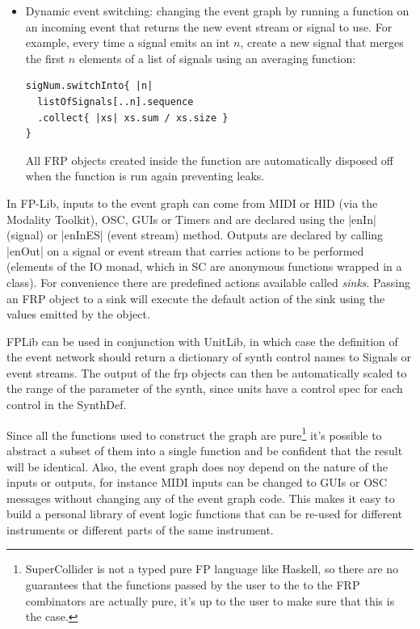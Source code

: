 \documentclass{article}
\begin{document}
\begin{itemize}
\begin{Verbatim}
\end{Verbatim}
\item Dynamic event switching: changing the event graph by running a function on an incoming event that returns the new event stream or signal to use. For example, every time a signal emits an int $n$, create a new signal that merges the first $n$ elements of a list of signals using an averaging function: 
\begin{Verbatim}
sigNum.switchInto{ |n|
  listOfSignals[..n].sequence
  .collect{ |xs| xs.sum / xs.size }
}
\end{Verbatim}
All FRP objects created inside the function are automatically disposed off when the function is run again preventing leaks.
\end{itemize}

In FP-Lib, inputs to the event graph can come from MIDI or HID (via the
Modality Toolkit), OSC, GUIs or Timers and are declared using  the |enIn| (signal) or |enInES| (event stream) method. Outputs are declared by calling |enOut| on a signal or event stream that carries actions to be performed (elements of the IO monad, which in SC are anonymous functions wrapped in a class). For convenience there are predefined actions available called \textit{sinks}. Passing an FRP object to a sink will execute the default action of the sink using the values emitted by the object.

FPLib can be used in conjunction with UnitLib, in which case the definition of the event network should return a dictionary of synth control names to Signals or event streams. The output of the frp objects can then be automatically scaled to the range of the parameter of the synth, since units have a control spec for each control in the SynthDef.

Since all the functions used to construct the graph are pure\footnote{SuperCollider is not a typed pure FP language like Haskell, so there are no guarantees that the functions passed by the user to the to the FRP combinators are actually pure, it's up to the user to make sure that this is the case.} it's possible to abstract a subset of them into a single function and be confident that the result will be identical. Also, the event graph does noy depend on the nature of the inputs or outputs, for instance MIDI inputs can be changed to GUIs or OSC messages without changing any of the event graph code. This makes it easy to build a personal library of event logic functions that can be re-used for different instruments or different parts of the same instrument.
\end{document}
